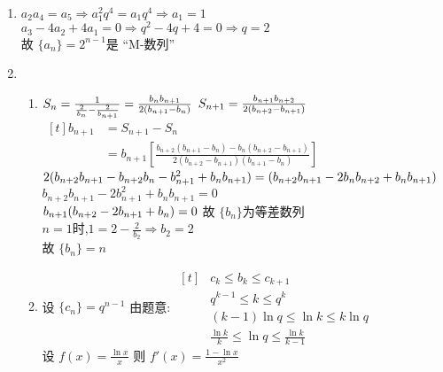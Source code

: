 \documentclass[class=ctexart,crop=false]{standalone}
\begin{document}
    \begin{enumerate}[label=(\arabic*)]
        \item $a_2a_4=a_5 \Rightarrow a_1^2q^4=a_1q^4 \Rightarrow a_1=1$\\
        $a_3-4a_2+4a_1=0 \Rightarrow q^2-4q+4=0 \Rightarrow q=2$\\
        故 $\{a_n\} =2^{n-1}$是 “M-数列”
        \item \begin{enumerate}[label=\protect \circled{ \arabic*}]
            \item   $S_n=\frac{1}{\frac{2}{b_n}-\frac{2}{b_{n+1}}}=\frac{b_nb_{n+1}}{2(b_{n+1}-b_n)} \\$
                    $S_{n+1}=\frac{b_{n+1}b_{n+2}}{2(b_{n+2}-b_{n+1})} \\  $
            $\begin{aligned}[t]
                b_{n+1}&=S_{n+1}-S_n\\
                &=b_{n+1}[\frac{b_{n+2}(b_{n+1}-b_n)-b_n(b_{n+2}-b_{n+1})}{2(b_{n+2}-b_{n+1})(b_{n+1}-b_{n})}]                    
            \end{aligned}$\\
$            2(b_{n+2}b_{n+1}-b_{n+2}b_{n}-b_{n+1}^2+b_{n}b_{n+1})\\
            =(b_{n+2}b_{n+1}-2b_{n}b_{n+2}+b_{n}b_{n+1})\\$
            $b_{n+2}b_{n+1}-2b_{n+1}^2+b_{n}b_{n+1}=0$\\
            $b_{n+1}(b_{n+2}-2b_{n+1}+b_n)=0\\$
            故 $\{b_n\} $为等差数列\\
            $n=1$时,$1=2-\frac{2}{b_2}\Rightarrow b_2=2$\\
            故 $\{b_n\}=n $
            \item 
            设 $\{c_n\}=q^{n-1} $
            由题意: 
            $\begin{aligned}[t]
                &c_{k}\leqslant b_k \leqslant c_{k+1}\\
                &q^{k-1} \leqslant k\leqslant q^{k} \\
                &(k-1)\ln{q} \leqslant \ln{k} \leqslant k\ln{q}\\
                &\frac{\ln{k}}{k} \leqslant \ln{q} \leqslant \frac{\ln{k}}{k-1}
            \end{aligned}$ \\
            设 $f(x)=\frac{\ln{x}}{x}$ 则 $f'(x)=\frac{1-\ln{x}}{x^2}$\\

\end{enumerate}
\end{enumerate}
\end{document}
